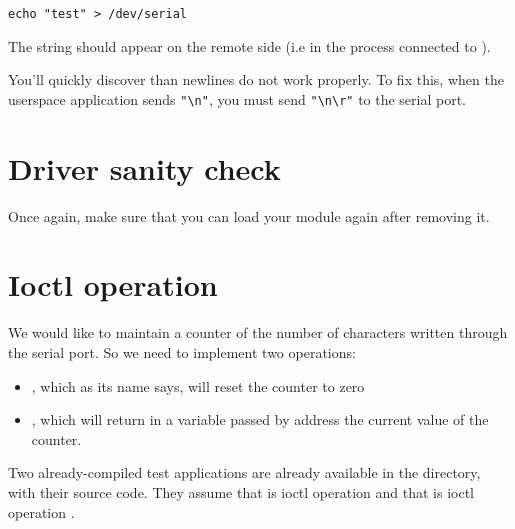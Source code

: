 \begin{verbatim}
echo "test" > /dev/serial
\end{verbatim}

The  string should appear on the remote side (i.e in
the  process connected to ).

You'll quickly discover than newlines do not work properly. To fix
this, when the userspace application sends \verb+"\n"+, you must send
\verb+"\n\r"+ to the serial port.

\section{Driver sanity check}

Once again, make sure that you can load your module again after
removing it.

\section{Ioctl operation}

We would like to maintain a counter of the number of characters
written through the serial port. So we need to implement two
 operations:
\begin{itemize}

 \item {}, which as its name says, will
   reset the counter to zero

 \item {}, which will return in a variable
   passed by address the current value of the counter.

\end{itemize}

Two already-compiled test applications are already available in the
 directory, with their source code. They assume that
 is ioctl operation  and that
 is ioctl operation .
